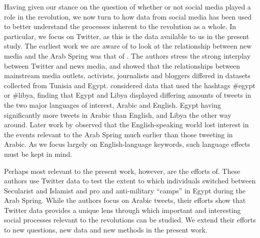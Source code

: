 Having given our stance on the question of whether or not social media played a role in the revolution, we now turn to how data from social media has been used to better understand the processes inherent to the revolution as a whole.  In particular, we focus on Twitter, as this is the data available to us in the present study.  The earliest work we are aware of to look at the relationship between new media and the Arab Spring was that of \cite{lotan_revolutions_2011}. The authors stress the strong interplay between Twitter and news media, and showed that the relationships between mainstream media outlets, activists, journalists and bloggers differed in datasets collected from Tunisia and Egypt. \cite{lotan_revolutions_2011} considered data that used the hashtags \#egypt or \#libya, finding that Egypt and Libya displayed differing amounts of tweets in the two major languages of interest, Arabic and English.  Egypt having significantly more tweets in Arabic than English, and Libya the other way around. Later work by \cite{bruns_arab_2013} observed that the English-speaking world lost interest in the events relevant to the Arab Spring much earlier than those tweeting in Arabic.   As we focus largely on English-language keywords, such language effects must be kept in mind.

Perhaps most relevant to the present work, however, are the efforts of\cite{borge-holthoefer_content_2014}. These authors use Twitter data to test the extent to which individuals switched between Secularist and Islamist and pro and anti-military ``camps'' in Egypt during the Arab Spring.  While the authors focus on Arabic tweets, their efforts show that Twitter data provides a unique lens through which important and interesting social processes relevant to the revolutions can be studied. We extend their efforts to new questions, new data and new methods in the present work.





